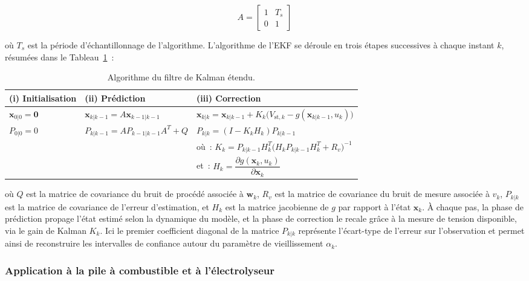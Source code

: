 \begin{equation}
    A = \begin{bmatrix} 1 & T_s \\ 0 & 1 \end{bmatrix}
    \label{eq:ekf_transition}
\end{equation}

où $T_s$ est la période d'échantillonnage de l'algorithme. L'algorithme de l'EKF se déroule en trois étapes successives à chaque instant $k$, résumées dans le Tableau~\ref{tab:ekf}~:

\begin{table}[h!]
\centering
\caption{Algorithme du filtre de Kalman étendu.}
\label{tab:ekf}
\begin{tabularx}{\textwidth}{lXX}
\hline
\textbf{(i) Initialisation} & \textbf{(ii) Prédiction} & \textbf{(iii) Correction} \\
\hline
$\mathbf{x}_{0|0} = \mathbf{0}$ &
$\mathbf{x}_{k|k-1} = A\mathbf{x}_{k-1|k-1}$ &
$\mathbf{x}_{k|k} = \mathbf{x}_{k|k-1} + K_k\bigl(V_{\text{st},k} - g(\mathbf{x}_{k|k-1}, u_k)\bigr)$ \\
$P_{0|0} = 0$ &
$P_{k|k-1} = AP_{k-1|k-1}A^T + Q$ &
$P_{k|k} = (I - K_k H_k)P_{k|k-1}$ \\
& &
où~: $K_k = P_{k|k-1}H_k^T\bigl(H_k P_{k|k-1}H_k^T + R_v\bigr)^{-1}$ \\
& & et~: $H_k = \dfrac{\partial g(\mathbf{x}_k, u_k)}{\partial \mathbf{x}_k}$ \\
\hline
\end{tabularx}
\end{table}

où $Q$ est la matrice de covariance du bruit de procédé associée à $\mathbf{w}_k$, $R_v$ est la matrice de covariance du bruit de mesure associée à $v_k$, $P_{k|k}$ est la matrice de covariance de l'erreur d'estimation, et $H_k$ est la matrice jacobienne de $g$ par rapport à l'état $\mathbf{x}_k$. À chaque pas, la phase de prédiction propage l'état estimé selon la dynamique du modèle, et la phase de correction le recale grâce à la mesure de tension disponible, via le gain de Kalman $K_k$. Ici le premier coefficient diagonal de la matrice $P_{k|k}$ représente l'écart-type de l'erreur sur l'observation et permet ainsi de reconstruire les intervalles de confiance autour du paramètre de vieillissement $\alpha_k$.

\subsubsection{Application à la pile à combustible et à l'électrolyseur}

